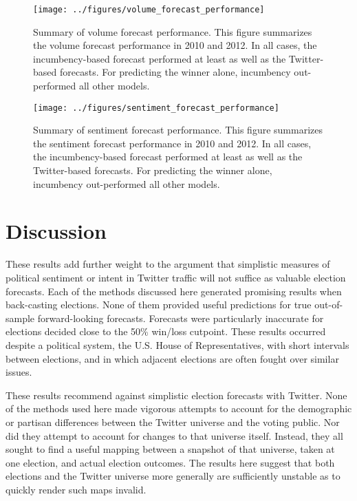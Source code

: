 \documentclass{sig-alternate-2013}
\begin{document}


\begin{figure}
  \centering
  \texttt{[image: ../figures/volume\_forecast\_performance]}
  \caption{Summary of volume forecast performance. This figure summarizes the volume forecast performance in 2010 and 2012. In all cases, the incumbency-based forecast performed at least as well as the Twitter-based forecasts. For predicting the winner alone, incumbency out-performed all other models. }
  \label{fig:lm_volume_model_graph}
\end{figure}
\begin{figure}
  \centering
  \texttt{[image: ../figures/sentiment\_forecast\_performance]}
  \caption{Summary of sentiment forecast performance. This figure summarizes the sentiment forecast performance in 2010 and 2012. In all cases, the incumbency-based forecast performed at least as well as the Twitter-based forecasts. For predicting the winner alone, incumbency out-performed all other models. }
  \label{fig:lm_sentiment_model_graph}
\end{figure}
%


\section{Discussion}
\label{sec:discussion}

These results add further weight to the argument that simplistic
measures of political sentiment or intent in Twitter traffic will not
suffice as valuable election forecasts. Each of the methods discussed
here generated promising results when back-casting elections. None of
them provided useful predictions for true out-of-sample
forward-looking forecasts. Forecasts were particularly inaccurate for
elections decided close to the 50\% win/loss cutpoint. These results
occurred despite a political system, the U.S. House of
Representatives, with short intervals between elections, and in which
adjacent elections are often fought over similar issues.

These results recommend against simplistic
election forecasts with Twitter. None of the methods used here made
vigorous attempts to account for the demographic or partisan
differences between the Twitter universe and the voting public. Nor
did they attempt to account for changes to that universe
itself. Instead, they all sought to find a useful mapping between a
snapshot of that universe, taken at one election, and actual election
outcomes. The results here suggest that both elections and the Twitter
universe more generally are sufficiently unstable as to quickly render
such maps invalid. 
\end{document}
